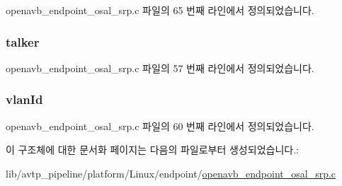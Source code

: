 openavb\+\_\+endpoint\+\_\+osal\+\_\+srp.\+c 파일의 65 번째 라인에서 정의되었습니다.

\subsubsection[{\texorpdfstring{talker}{talker}}]{ talker}\hypertarget{structstr_elem__t_a6be038e79a0f77feb1e908233b35195a}{}\label{structstr_elem__t_a6be038e79a0f77feb1e908233b35195a}


openavb\+\_\+endpoint\+\_\+osal\+\_\+srp.\+c 파일의 57 번째 라인에서 정의되었습니다.

\subsubsection[{\texorpdfstring{vlan\+Id}{vlanId}}]{ vlan\+Id}\hypertarget{structstr_elem__t_a252d0c6d3b370c0cd1d20702594357bd}{}\label{structstr_elem__t_a252d0c6d3b370c0cd1d20702594357bd}


openavb\+\_\+endpoint\+\_\+osal\+\_\+srp.\+c 파일의 60 번째 라인에서 정의되었습니다.



이 구조체에 대한 문서화 페이지는 다음의 파일로부터 생성되었습니다.\+:\begin{DoxyCompactItemize}
\item 
lib/avtp\+\_\+pipeline/platform/\+Linux/endpoint/\hyperlink{openavb__endpoint__osal__srp_8c}{openavb\+\_\+endpoint\+\_\+osal\+\_\+srp.\+c}\end{DoxyCompactItemize}
